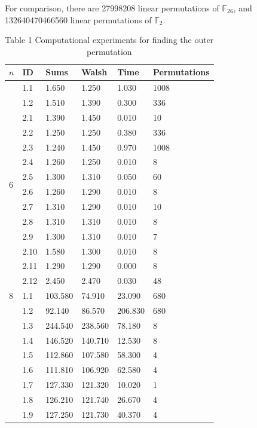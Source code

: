 \documentclass[10pt]{article}
\begin{document}
For comparison, there are 27998208 linear permutations of $\mathbb{F}_{26}$, and 132640470466560 linear permutations of $\mathbb{F}_{2}$.

\begin{table}[h]
\begin{center}
\captionsetup{labelformat=empty}
\caption{Table 1 Computational experiments for finding the outer permutation}
\begin{tabular}{|l|l|l|l|l|l|}
\hline
$n$ & ID & Sums & Walsh & Time & Permutations \\
\hline
\multirow[t]{14}{*}{6} & 1.1 & 1.650 & 1.250 & 1.030 & 1008 \\
\hline
 & 1.2 & 1.510 & 1.390 & 0.300 & 336 \\
\hline
 & 2.1 & 1.390 & 1.450 & 0.010 & 10 \\
\hline
 & 2.2 & 1.250 & 1.250 & 0.380 & 336 \\
\hline
 & 2.3 & 1.240 & 1.450 & 0.970 & 1008 \\
\hline
 & 2.4 & 1.260 & 1.250 & 0.010 & 8 \\
\hline
 & 2.5 & 1.300 & 1.310 & 0.050 & 60 \\
\hline
 & 2.6 & 1.260 & 1.290 & 0.010 & 8 \\
\hline
 & 2.7 & 1.310 & 1.290 & 0.010 & 10 \\
\hline
 & 2.8 & 1.310 & 1.310 & 0.010 & 8 \\
\hline
 & 2.9 & 1.300 & 1.310 & 0.010 & 7 \\
\hline
 & 2.10 & 1.580 & 1.300 & 0.010 & 8 \\
\hline
 & 2.11 & 1.290 & 1.290 & 0.000 & 8 \\
\hline
 & 2.12 & 2.450 & 2.470 & 0.030 & 48 \\
\hline
8 & 1.1 & 103.580 & 74.910 & 23.090 & 680 \\
\hline
 & 1.2 & 92.140 & 86.570 & 206.830 & 680 \\
\hline
 & 1.3 & 244.540 & 238.560 & 78.180 & 8 \\
\hline
 & 1.4 & 146.520 & 140.710 & 12.530 & 8 \\
\hline
 & 1.5 & 112.860 & 107.580 & 58.300 & 4 \\
\hline
 & 1.6 & 111.810 & 106.920 & 62.580 & 4 \\
\hline
 & 1.7 & 127.330 & 121.320 & 10.020 & 1 \\
\hline
 & 1.8 & 126.210 & 121.740 & 26.670 & 4 \\
\hline
 & 1.9 & 127.250 & 121.730 & 40.370 & 4 \\

\end{tabular}
\end{center}
\end{table}
\end{document}
